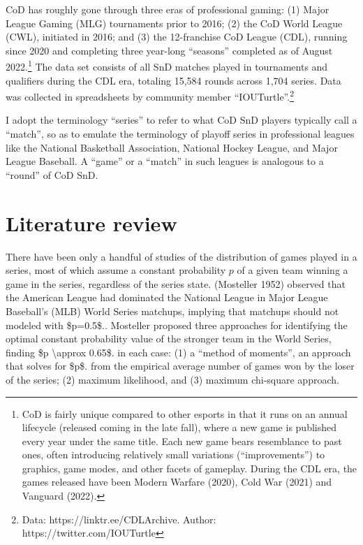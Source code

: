 \documentclass[
]{article}
\begin{document}
CoD has roughly gone through three eras of professional gaming: (1)
Major League Gaming (MLG) tournaments prior to 2016; (2) the CoD World
League (CWL), initiated in 2016; and (3) the 12-franchise CoD League
(CDL), running since 2020 and completing three year-long ``seasons''
completed as of August 2022.\footnote{CoD is fairly unique compared to
  other esports in that it runs on an annual lifecycle (released coming
  in the late fall), where a new game is published every year under the
  same title. Each new game bears resemblance to past ones, often
  introducing relatively small variations (``improvements'') to
  graphics, game modes, and other facets of gameplay. During the CDL
  era, the games released have been Modern Warfare (2020), Cold War
  (2021) and Vanguard (2022).} The data set consists of all SnD matches
played in tournaments and qualifiers during the CDL era, totaling 15,584
rounds across 1,704 series. Data was collected in spreadsheets by
community member ``IOUTurtle''.\footnote{Data:
  https://linktr.ee/CDLArchive. Author: https://twitter.com/IOUTurtle}

I adopt the terminology ``series'' to refer to what CoD SnD players
typically call a ``match'', so as to emulate the terminology of playoff
series in professional leagues like the National Basketball Association,
National Hockey League, and Major League Baseball. A ``game'' or a
``match'' in such leagues is analogous to a ``round'' of CoD SnD.

\hypertarget{literature-review}{%
\section{Literature review}\label{literature-review}}

There have been only a handful of studies of the distribution of games
played in a series, most of which assume a constant probability \(p\) of
a given team winning a game in the series, regardless of the series
state. (Mosteller 1952) observed that the American League had dominated
the National League in Major League Baseball's (MLB) World Series
matchups, implying that matchups should not modeled with \$p=0.5\$..
Mosteller proposed three approaches for identifying the optimal constant
probability value of the stronger team in the World Series, finding \$p
\textbackslash approx 0.65\$. in each case: (1) a ``method of moments'',
an approach that solves for \$p\$. from the empirical average number of
games won by the loser of the series; (2) maximum likelihood, and (3)
maximum chi-square approach.
\end{document}

